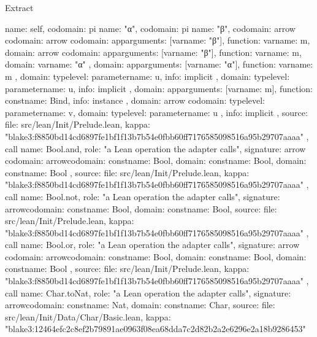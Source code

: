 \begin{lexlean}{Extract}
\begin{toolingmodule}
{{{{          name: self,
          codomain: pi{
            name: "α",
            codomain: pi{
              name: "β",
              codomain: arrow{
                codomain: arrow{
                  codomain: app{arguments: [var{name: "β"}], function: var{name: m}},
                  domain: arrow{
                    codomain: app{arguments: [var{name: "β"}], function: var{name: m}},
                    domain: var{name: "α"}
                  }
                },
                domain: app{arguments: [var{name: "α"}], function: var{name: m}}
              },
              domain: type{level: parameter{name: u}},
              info: implicit
            },
            domain: type{level: parameter{name: u}},
            info: implicit
          },
          domain: app{arguments: [var{name: m}], function: const{name: Bind}},
          info: instance
        },
        domain: arrow{
          codomain: type{level: parameter{name: v}},
          domain: type{level: parameter{name: u}}
        },
        info: implicit
      },
      source: {
        file: src/lean/Init/Prelude.lean,
        kappa: "blake3:f8850bd14cd6897fe1bf1f13b7b54e0fbb60ff7176585098516a95b29707aaaa"
      }
    },
    call{
      name: Bool.and,
      role: "a Lean operation the adapter calls",
      signature: arrow{
        codomain: arrow{codomain: const{name: Bool}, domain: const{name: Bool}},
        domain: const{name: Bool}
      },
      source: {
        file: src/lean/Init/Prelude.lean,
        kappa: "blake3:f8850bd14cd6897fe1bf1f13b7b54e0fbb60ff7176585098516a95b29707aaaa"
      }
    },
    call{
      name: Bool.not,
      role: "a Lean operation the adapter calls",
      signature: arrow{codomain: const{name: Bool}, domain: const{name: Bool}},
      source: {
        file: src/lean/Init/Prelude.lean,
        kappa: "blake3:f8850bd14cd6897fe1bf1f13b7b54e0fbb60ff7176585098516a95b29707aaaa"
      }
    },
    call{
      name: Bool.or,
      role: "a Lean operation the adapter calls",
      signature: arrow{
        codomain: arrow{codomain: const{name: Bool}, domain: const{name: Bool}},
        domain: const{name: Bool}
      },
      source: {
        file: src/lean/Init/Prelude.lean,
        kappa: "blake3:f8850bd14cd6897fe1bf1f13b7b54e0fbb60ff7176585098516a95b29707aaaa"
      }
    },
    call{
      name: Char.toNat,
      role: "a Lean operation the adapter calls",
      signature: arrow{codomain: const{name: Nat}, domain: const{name: Char}},
      source: {
        file: src/lean/Init/Data/Char/Basic.lean,
        kappa: "blake3:12464efc2c8ef2b79891ae0963f08ea68dda7c2d82b2a2e6296e2a18b9286453"
}}}
\end{toolingmodule}
\end{lexlean}
